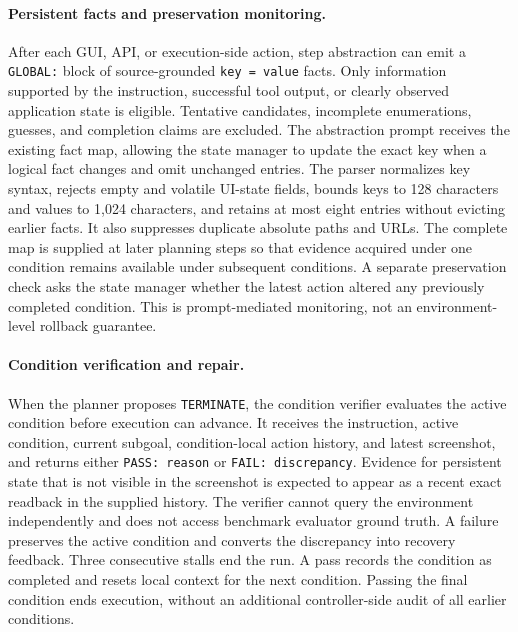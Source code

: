 \documentclass[11pt]{article}
\begin{document}
\paragraph{Persistent facts and preservation monitoring.}
After each GUI, API, or execution-side action, step abstraction can emit a \texttt{GLOBAL:} block of source-grounded \texttt{key = value} facts. Only information supported by the instruction, successful tool output, or clearly observed application state is eligible. Tentative candidates, incomplete enumerations, guesses, and completion claims are excluded. The abstraction prompt receives the existing fact map, allowing the state manager to update the exact key when a logical fact changes and omit unchanged entries. The parser normalizes key syntax, rejects empty and volatile UI-state fields, bounds keys to 128 characters and values to 1,024 characters, and retains at most eight entries without evicting earlier facts. It also suppresses duplicate absolute paths and URLs. The complete map is supplied at later planning steps so that evidence acquired under one condition remains available under subsequent conditions. A separate preservation check asks the state manager whether the latest action altered any previously completed condition. This is prompt-mediated monitoring, not an environment-level rollback guarantee.

\paragraph{Condition verification and repair.}
When the planner proposes \texttt{TERMINATE}, the condition verifier evaluates the active condition before execution can advance. It receives the instruction, active condition, current subgoal, condition-local action history, and latest screenshot, and returns either \texttt{PASS: reason} or \texttt{FAIL: discrepancy}. Evidence for persistent state that is not visible in the screenshot is expected to appear as a recent exact readback in the supplied history. The verifier cannot query the environment independently and does not access benchmark evaluator ground truth. A failure preserves the active condition and converts the discrepancy into recovery feedback. Three consecutive stalls end the run. A pass records the condition as completed and resets local context for the next condition. Passing the final condition ends execution, without an additional controller-side audit of all earlier conditions.
\end{document}
